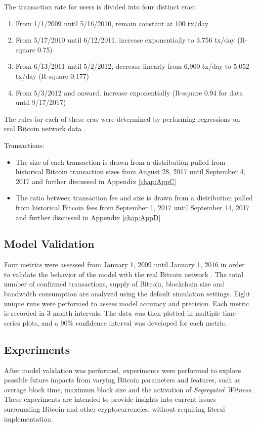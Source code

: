 \documentclass[12pt]{report}
\begin{document}
The transaction rate for users is divided into four distinct eras:
\begin{enumerate}
\item From 1/1/2009 until 5/16/2010, remain constant at 100 tx/day
\item From 5/17/2010 until 6/12/2011, increase exponentially to 3,756 tx/day (R-square 0.75)
\item From 6/13/2011 until 5/2/2012, decrease linearly from 6,900 tx/day to 5,052 tx/day (R-square 0.177)
\item From 5/3/2012 and onward, increase exponentially (R-square 0.94 for data until 9/17/2017)
\end{enumerate}
The rules for each of these eras were determined by performing regressions on real Bitcoin network data \cite{blockchain.info.}.

Transactions:
\begin{itemize}
\item The size of each transaction is drawn from a distribution pulled from historical Bitcoin transaction sizes from August 28, 2017 until September 4, 2017 \cite{TradeBlock.com.} and further discussed in Appendix \autoref{chap:AppC}
\item The ratio between transaction fee and size is drawn from a distribution pulled from historical Bitcoin fees from September 1, 2017 until September 14, 2017 \cite{jochenhoenicke.de.} and further discussed in Appendix \autoref{chap:AppD}
\end{itemize}

\subsection{Model Validation}
Four metrics were assessed from January 1, 2009 until January 1, 2016 in order to validate the behavior of the model with the real Bitcoin network \cite{blockchain.info.,Lopp.2017}. The total number of confirmed transactions, supply of Bitcoin, blockchain size and bandwidth consumption are analyzed using the default simulation settings. Eight unique runs were performed to assess model accuracy and precision. Each metric is recorded in 3 month intervals. The data was then plotted in  multiple time series plots, and a 90\% confidence interval was developed for each metric.

\subsection{Experiments}
After model validation was performed, experiments were performed to explore possible future impacts from varying Bitcoin parameters and features, such as average block time, maximum block size and the activation of \textit{Segregated Witness}. These experiments are intended to provide insights into current issues surrounding Bitcoin and other cryptocurrencies, without requiring literal implementation.
\end{document}
